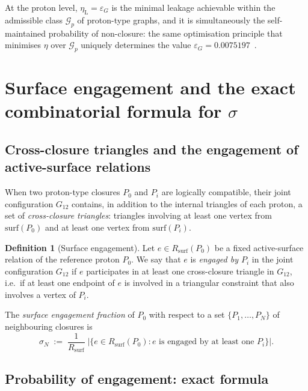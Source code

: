 \documentclass[11pt,a4paper]{article}
\theoremstyle{definition}
\newtheorem{definition}[theorem]{Definition}
\newcommand{\Rsurf}{R_{\mathrm{surf}}}
\newcommand{\epsg}{\varepsilon_G}
\newcommand{\etaL}{\eta_{\mathrm{L}}}
\newcommand{\sig}{\sigma}
\begin{document}
At the proton level, $\etaL = \epsg$ is the minimal leakage achievable within the admissible class $\mathcal{G}_p$ of proton-type graphs, and it is simultaneously the self-maintained probability of non-closure: the same optimisation principle that minimises $\eta$ over $\mathcal{G}_p$ uniquely determines the value $\epsg = 0.0075197$~\cite{PDL_Bridge_2026}.

\section{Surface engagement and the exact combinatorial formula for \texorpdfstring{$\sigma$}{sigma}}
\label{sec:engagement}

\subsection{Cross-closure triangles and the engagement of active-surface relations}
\label{subsec:cross_triangles}

When two proton-type closures $P_0$ and $P_i$ are logically compatible, their joint configuration $G_{12}$ contains, in addition to the internal triangles of each proton, a set of \emph{cross-closure triangles}: triangles involving at least one vertex from $\text{surf}(P_0)$ and at least one vertex from $\text{surf}(P_i)$.

\begin{definition}[Surface engagement]
\label{def:engagement}
Let $e \in \Rsurf(P_0)$ be a fixed active-surface relation of the reference proton $P_0$. We say that $e$ is \emph{engaged by $P_i$} in the joint configuration $G_{12}$ if $e$ participates in at least one cross-closure triangle in $G_{12}$, i.e.\ if at least one endpoint of $e$ is involved in a triangular constraint that also involves a vertex of $P_i$.

The \emph{surface engagement fraction} of $P_0$ with respect to a set $\{P_1,\ldots,P_N\}$ of neighbouring closures is
\begin{equation}
  \label{eq:sig_def}
  \sig_N \;:=\; \frac{1}{\Rsurf}\;\bigl|\bigl\{e \in \Rsurf(P_0) : e \text{ is engaged by at least one } P_i\bigr\}\bigr|.
\end{equation}
\end{definition}

\subsection{Probability of engagement: exact formula}
\label{subsec:engagement_proof}
\end{document}
